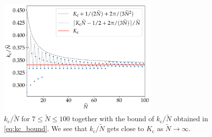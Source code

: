 \begin{figure}
    \centering
    \includegraphics[width=0.7\textwidth]{figs/kc.pdf}
    \caption{
        $k_{\mathrm{c}}/\widetilde{N}$ for $7\leq\widetilde{N}\leq100$ together with the bound of $k_{\mathrm{c}}/\widetilde{N}$ obtained in \eqref{eq:kc_bound}.
        We see that $k_{\mathrm{c}}/\widetilde{N}$ gets close to $K_{\mathrm{c}}$ as $\widetilde{N}\to\infty$.
    }
    \label{fig:kc}
\end{figure}
